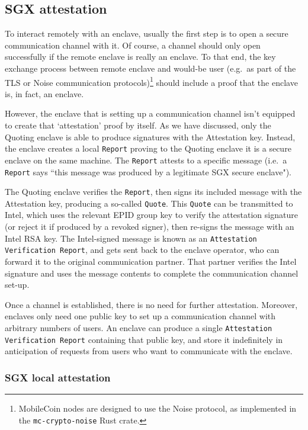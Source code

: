 \subsection{SGX attestation}
\label{subsec:enclaves-sgx-attestation}

To interact remotely with an enclave, usually the first step is to open a secure communication channel with it. Of course, a channel should only open successfully if the remote enclave is really an enclave. To that end, the key exchange process between remote enclave and would-be user (e.g.\ as part of the TLS \cite{tls-transport-layer-security-resource} or Noise \cite{noise-protocol-framework} communication protocols)\footnote{MobileCoin nodes are designed to use the Noise protocol, as implemented in the {\tt mc-crypto-noise} Rust crate.} should include a proof that the enclave is, in fact, an enclave.

However, the enclave that is setting up a communication channel isn't equipped to create that `attestation' proof by itself. As we have discussed, only the Quoting enclave is able to produce signatures with the Attestation key. Instead, the enclave creates a local {\tt Report} proving to the Quoting enclave it is a secure enclave on the same machine. The {\tt Report} attests to a specific message (i.e.\ a {\tt Report} says ``this message was produced by a legitimate SGX secure enclave").

The Quoting enclave verifies the {\tt Report}, then signs its included message with the Attestation key, producing a so-called {\tt Quote}. This {\tt Quote} can be transmitted to Intel, which uses the relevant EPID group key to verify the attestation signature (or reject it if produced by a revoked signer), then re-signs the message with an Intel RSA key. The Intel-signed message is known as an {\tt Attestation Verification Report}, and gets sent back to the enclave operator, who can forward it to the original communication partner. That partner verifies the Intel signature and uses the message contents to complete the communication channel set-up.

Once a channel is established, there is no need for further attestation. Moreover, enclaves only need one public key to set up a communication channel with arbitrary numbers of users. An enclave can produce a single {\tt Attestation Verification Report} containing that public key, and store it indefinitely in anticipation of requests from users who want to communicate with the enclave.

\subsubsection{SGX local attestation}

